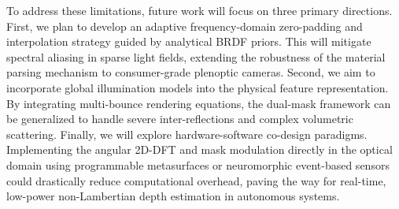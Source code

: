 To address these limitations, future work will focus on three primary directions. First, we plan to develop an adaptive frequency-domain zero-padding and interpolation strategy guided by analytical BRDF priors. This will mitigate spectral aliasing in sparse light fields, extending the robustness of the material parsing mechanism to consumer-grade plenoptic cameras. Second, we aim to incorporate global illumination models into the physical feature representation. By integrating multi-bounce rendering equations, the dual-mask framework can be generalized to handle severe inter-reflections and complex volumetric scattering. Finally, we will explore hardware-software co-design paradigms. Implementing the angular 2D-DFT and mask modulation directly in the optical domain using programmable metasurfaces or neuromorphic event-based sensors could drastically reduce computational overhead, paving the way for real-time, low-power non-Lambertian depth estimation in autonomous systems.